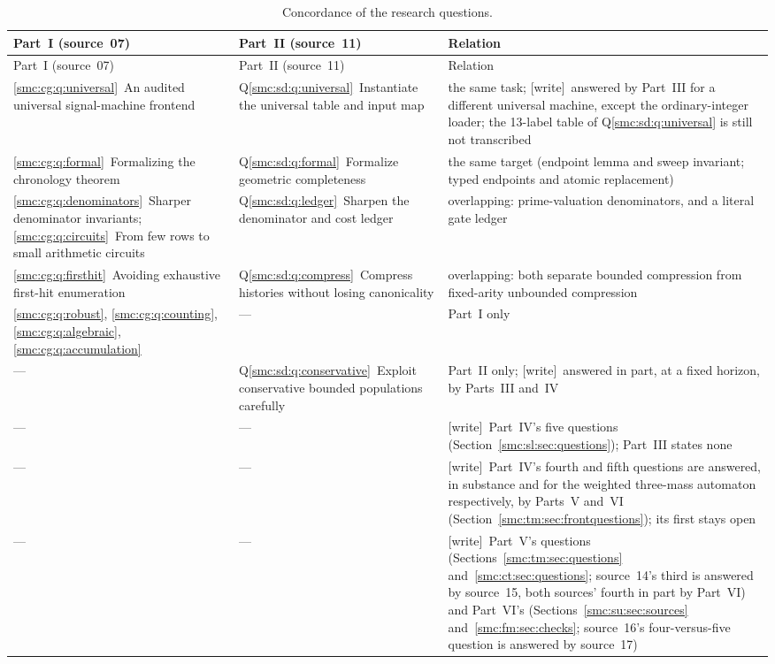 \documentclass[11pt,letterpaper]{article}
\numberwithin{equation}{section}
\theoremstyle{definition}
\theoremstyle{remark}
\newcommand{\wtag}{\textup{[write]}}
\begin{document}
\begin{center}
\small
\begin{longtable}{@{}L{0.3\textwidth}L{0.3\textwidth}L{0.32\textwidth}@{}}
\caption{Concordance of the research questions.}\label{smc:tab:questions}\\
\toprule
Part~I (source~07) & Part~II (source~11) & Relation\\
\midrule
\endfirsthead
\toprule
Part~I (source~07) & Part~II (source~11) & Relation\\
\midrule
\endhead
\ref{smc:cg:q:universal}~An audited universal signal-machine frontend & Q\ref{smc:sd:q:universal}~Instantiate the universal table and input map & the same task; \wtag\ answered by Part~III for a different universal machine, except the ordinary-integer loader; the 13-label table of Q\ref{smc:sd:q:universal} is still not transcribed\\
\ref{smc:cg:q:formal}~Formalizing the chronology theorem & Q\ref{smc:sd:q:formal}~Formalize geometric completeness & the same target (endpoint lemma and sweep invariant; typed endpoints and atomic replacement)\\
\ref{smc:cg:q:denominators}~Sharper denominator invariants; \ref{smc:cg:q:circuits}~From few rows to small arithmetic circuits & Q\ref{smc:sd:q:ledger}~Sharpen the denominator and cost ledger & overlapping: prime-valuation denominators, and a literal gate ledger\\
\ref{smc:cg:q:firsthit}~Avoiding exhaustive first-hit enumeration & Q\ref{smc:sd:q:compress}~Compress histories without losing canonicality & overlapping: both separate bounded compression from fixed-arity unbounded compression\\
\ref{smc:cg:q:robust}, \ref{smc:cg:q:counting}, \ref{smc:cg:q:algebraic}, \ref{smc:cg:q:accumulation} & --- & Part~I only\\
--- & Q\ref{smc:sd:q:conservative}~Exploit conservative bounded populations carefully & Part~II only; \wtag\ answered in part, at a fixed horizon, by Parts~III and~IV\\
--- & --- & \wtag\ Part~IV's five questions (Section~\ref{smc:sl:sec:questions}); Part~III states none\\
--- & --- & \wtag\ Part~IV's fourth and fifth questions are answered, in substance and for the weighted three-mass automaton respectively, by Parts~V and~VI (Section~\ref{smc:tm:sec:frontquestions}); its first stays open\\
--- & --- & \wtag\ Part~V's questions (Sections~\ref{smc:tm:sec:questions} and~\ref{smc:ct:sec:questions}; source~14's third is answered by source~15, both sources' fourth in part by Part~VI) and Part~VI's (Sections~\ref{smc:su:sec:sources} and~\ref{smc:fm:sec:checks}; source~16's four-versus-five question is answered by source~17)\\

\end{longtable}
\end{center}
\end{document}
